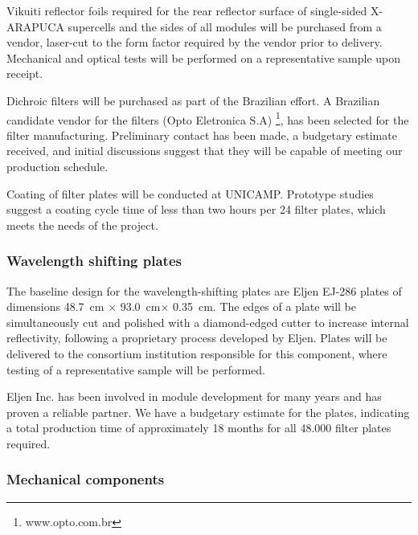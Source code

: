 Vikuiti reflector foils required for the rear reflector surface of single-sided X-ARAPUCA supercells and the sides of all modules will be purchased from a vendor, laser-cut to the form factor required by the vendor prior to delivery.  Mechanical and optical  tests will be performed on a representative sample upon receipt.


Dichroic filters will be purchased as part of the Brazilian effort.  A Brazilian candidate vendor for the filters (Opto Eletronica S.A) \footnote{www.opto.com.br}, has been selected for the filter manufacturing.  Preliminary contact has been made, a budgetary estimate received, and initial discussions suggest that they will be capable of meeting our production schedule.

Coating of filter plates will be conducted at UNICAMP.  Prototype studies suggest a coating cycle time of less than two hours per \num{24} filter plates, which meets the needs of the project.

\subsubsection{Wavelength shifting plates}

The baseline design for the wavelength-shifting plates are %
Eljen EJ-286 plates of dimensions \SI{48.7}{cm} $\times$ \SI{93.0}{cm}$\times$ \SI{0.35}{cm}.  The edges of a plate will be simultaneously cut and polished with a diamond-edged cutter to increase internal reflectivity, following a proprietary process developed by Eljen.  Plates will be delivered to the consortium institution responsible for this component, where  testing of a representative sample will be performed.


Eljen Inc. has been involved in  module development for many years and has proven a reliable partner.  We have a budgetary estimate for the plates, indicating a total production time of approximately \num{18} months for all \num{48,000} filter plates required.

\subsubsection{Mechanical components}

